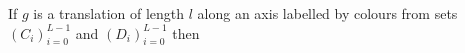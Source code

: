 \documentclass[preview]{standalone}
\begin{document}
\begin{center}
If $g$ is a translation of length $l$ along an axis labelled by colours from sets $(C_i)_{i=0}^{L-1}$ and $(D_i)_{i=0}^{L-1}$ then
\end{center}
\end{document}
